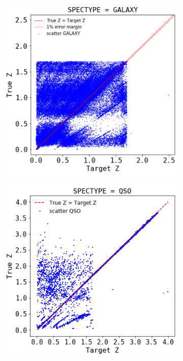 \begin{figure}
	\centering
	\begin{subfigure}[b]{0.5\textwidth}
		\includegraphics[width=1\linewidth]{TeX_files/Imagenes/GALAXY-z-truez}
		\caption{}
		\label{fig:GALAXY-z-truez} 
	\end{subfigure}	
	\begin{subfigure}[b]{0.5\textwidth}
		\includegraphics[width=1\linewidth]{TeX_files/Imagenes/QSO-z-truez}

\end{subfigure}
\end{figure}
